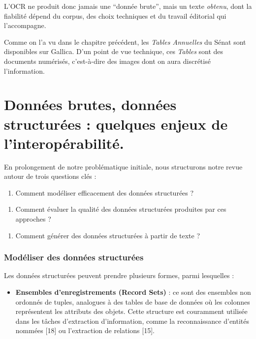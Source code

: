 L’OCR ne produit donc jamais une \enquote{donnée brute}, mais un texte \emph{obtenu}, dont la fiabilité dépend du corpus, des choix techniques et du travail éditorial qui l’accompagne.

Comme on l'a vu dans le chapitre précédent, les \emph{Tables Annuelles} du Sénat sont disponibles sur Gallica. D'un point de vue technique, ces \emph{Tables} sont des documents numérisés, c'est-à-dire des images dont on aura discrétisé l'information. 

\chapter{Données brutes, données structurées : quelques enjeux de l'interopérabilité.}

En prolongement de notre problématique initiale, nous structurons notre revue autour de trois questions clés :

\begin{enumerate}
\item Comment modéliser efficacement des données structurées ?
\end{enumerate}

\begin{enumerate}
\item Comment évaluer la qualité des données structurées produites par ces approches ?
\end{enumerate}

\begin{enumerate}
\item Comment générer des données structurées à partir de texte ?
\end{enumerate}

\subsection{Modéliser des données structurées}

Les données structurées peuvent prendre plusieurs formes, parmi lesquelles :

\begin{itemize}
\item \textbf{Ensembles d’enregistrements (Record Sets)} : ce sont des ensembles non ordonnés de tuples, analogues à des tables de base de données où les colonnes représentent les attributs des objets. Cette structure est couramment utilisée dans les tâches d’extraction d’information, comme la reconnaissance d’entités nommées [18] ou l’extraction de relations [15].
\end{itemize}


